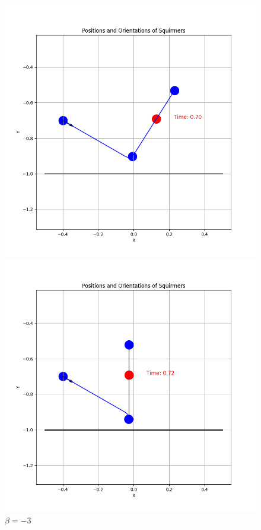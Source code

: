 \documentclass{article}
\begin{document}
\begin{figure}[H]
\begin{minipage}{0.49\textwidth}
        \caption{\footnotesize $\beta = 3$}
    \end{minipage}
    \begin{minipage}{0.49\textwidth}
        \includegraphics[width=1.1\textwidth]{graphs/simulations/border/betam1_5/mpi_6.png}
        \caption{\footnotesize $\beta = -1.5$}
    \end{minipage}\hfill
    \begin{minipage}{0.49\textwidth}
        \includegraphics[width=1.1\textwidth]{graphs/simulations/border/betam3/mpi_6.png}
        \caption{\footnotesize $\beta = -3$}
    \end{minipage}
\end{figure}
\end{document}
